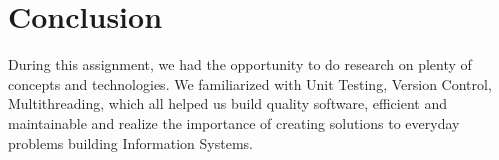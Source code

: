 \documentclass{article}
\begin{document}
\section{Conclusion}
During this assignment, we had the opportunity to do research on plenty of concepts and technologies. We familiarized with Unit Testing, Version Control, Multithreading, which all helped us build quality software, efficient and maintainable and realize the importance of creating solutions to everyday problems building Information Systems.
\end{document}

